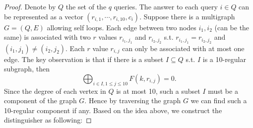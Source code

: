 \documentclass[12pt]{article}
\theoremstyle{definition}
\begin{document}
\begin{proof}
Denote by $Q$ the set of the $q$ queries. The answer to each query $i \in Q$ can be represented as a vector $(r_{i,1}, \cdots, r_{i,10}, c_i)$. 
Suppose there is a multigraph $G = (Q, E)$ allowing self loops. Each edge between two nodes $i_1, i_2$ (can be the same) is associated with two $r$ values $r_{i_1,j_1}$ and $r_{i_2,j_2}$ s.t. $r_{i_1,j_1} = r_{i_2,j_2}$ and $(i_1,j_1) \not= (i_2, j_2)$. Each $r$ value $r_{i,j}$ can only be associated with at most one edge. 
The key observation is that if there is a subset $I \subseteq Q$ s.t. $I$ is a 10-regular subgraph, then 
$$\bigoplus_{i \in I, 1\leq j \leq 10}F(k, r_{i,j}) = 0.$$
Since the degree of each vertex in $Q$ is at most 10, such a subset $I$ must be a component of the graph $G$. 
Hence by traversing the graph $G$ we can find such a 10-regular component if any. 
Based on the idea above, we construct the distinguisher as following:


\end{proof}
\end{document}

